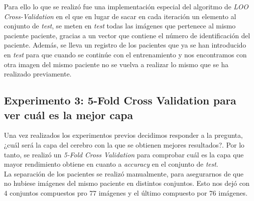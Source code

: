 Para ello lo que se realizó fue una implementación especial del algoritmo de \textit{LOO Cross-Validation} en el que en lugar de sacar en cada iteración un elemento al conjunto de \textit{test}, se meten en \textit{test} todas las imágenes que pertenece al mismo paciente paciente, gracias a un vector que contiene el número de identificación del paciente. Además, se lleva un registro de los pacientes que ya se han introducido en \textit{test} para que cuando se continúe con el entrenamiento y nos encontramos con otra imagen del mismo paciente no se vuelva a realizar lo mismo que se ha realizado previamente.\\
\subsection{Experimento 3:  5-Fold Cross Validation para ver cuál es la mejor capa}

Una vez realizados los experimentos previos decidimos responder a la pregunta, ¿cuál será la capa del cerebro con la que se obtienen mejores resultados?. Por lo tanto, se realizó un \textit{5-Fold Cross Validation} para comprobar cuál es la capa que mayor rendimiento obtiene en cuanto a \textit{accuracy} en el conjunto de \textit{test}.\\

La separación de los pacientes se realizó manualmente, para asegurarnos de que no hubiese imágenes del mismo paciente en distintos conjuntos. Esto nos dejó con 4 conjuntos compuestos pro 77 imágenes y el último compuesto por 76 imágenes.